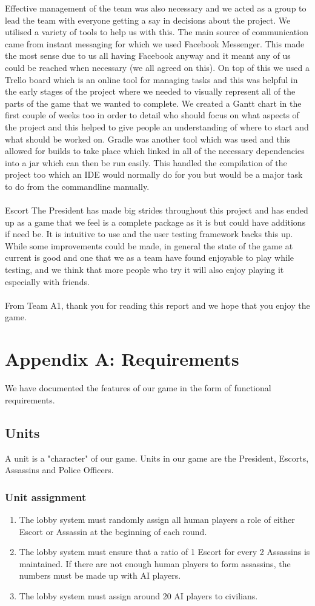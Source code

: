 \documentclass[12pt]{article}
\newcommand{\return}{\\\\\noindent}
\newenvironment{req} {\begin{enumerate}[leftmargin=2.5cm, label = \textbf{REQ \arabic{subsection}.\arabic{subsubsection}.\arabic*:}]} {\end{enumerate}}
\begin{document}
Effective management of the team was also necessary and we acted as a group to lead the team with everyone getting a say in decisions about the project. We utilised a variety of tools to help us with this. The main source of communication came from instant messaging for which we used Facebook Messenger. This made the most sense due to us all having Facebook anyway and it meant any of us could be reached when necessary (we all agreed on this). On top of this we used a Trello board which is an online tool for managing tasks and this was helpful in the early stages of the project where we needed to visually represent all of the parts of the game that we wanted to complete. We created a Gantt chart in the first couple of weeks too in order to detail who should focus on what aspects of the project and this helped to give people an understanding of where to start and what should be worked on. Gradle was another tool which was used and this allowed for builds to take place which linked in all of the necessary dependencies into a jar which can then be run easily. This handled the compilation of the project too which an IDE would normally do for you but would be a major task to do from the commandline manually.\return
Escort The President has made big strides throughout this project and has ended up as a game that we feel is a complete package as it is but could have additions if need be. It is intuitive to use and the user testing framework backs this up. While some improvements could be made, in general the state of the game at current is good and one that we as a team have found enjoyable to play while testing, and we think that more people who try it will also enjoy playing it especially with friends.\return
From Team A1, thank you for reading this report and we hope that you enjoy the game.
\newpage
\appendix
\section{Appendix A: Requirements}
We have documented the features of our game in the form of functional requirements.

\subsection{Units}
A unit is a "character" of our game. Units in our game are the President, Escorts, Assassins and Police Officers.

\subsubsection{Unit assignment}
\begin{req}
	\item The lobby system must randomly assign all human players a role of either Escort or Assassin at the beginning of each round.
	\item The lobby system must ensure that a ratio of 1 Escort for every 2 Assassins is maintained. If there are not enough human players to form assassins, the numbers must be made up with AI players.
	\item The lobby system must assign around 20 AI players to civilians.
\end{req}
\end{document}
